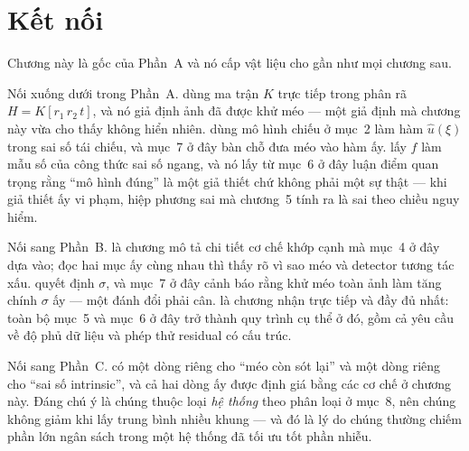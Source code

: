 \documentclass[../../marker.tex]{subfiles}
\begin{document}
\section{Kết nối}

Chương này là gốc của Phần~A và nó cấp vật liệu cho gần như mọi chương sau.

Nối xuống dưới trong Phần~A.  dùng ma trận \(K\) trực tiếp trong phân rã \(H = K[r_1\,r_2\,t]\), và nó giả định ảnh đã được khử méo --- một giả định mà chương này vừa cho thấy không hiển nhiên.  dùng mô hình chiếu ở mục~2 làm hàm \(\hat{u}(\xi)\) trong sai số tái chiếu, và mục~7 ở đây bàn chỗ đưa méo vào hàm ấy.  lấy \(f\) làm mẫu số của công thức sai số ngang, và nó lấy từ mục~6 ở đây luận điểm quan trọng rằng ``mô hình đúng'' là một giả thiết chứ không phải một sự thật --- khi giả thiết ấy vi phạm, hiệp phương sai mà chương~5 tính ra là sai theo chiều nguy hiểm.

Nối sang Phần~B.  là chương mô tả chi tiết cơ chế khớp cạnh mà mục~4 ở đây dựa vào; đọc hai mục ấy cùng nhau thì thấy rõ vì sao méo và detector tương tác xấu.  quyết định \(\sigma\), và mục~7 ở đây cảnh báo rằng khử méo toàn ảnh làm tăng chính \(\sigma\) ấy --- một đánh đổi phải cân.  là chương nhận trực tiếp và đầy đủ nhất: toàn bộ mục~5 và mục~6 ở đây trở thành quy trình cụ thể ở đó, gồm cả yêu cầu về độ phủ dữ liệu và phép thử residual có cấu trúc.

Nối sang Phần~C.  có một dòng riêng cho ``méo còn sót lại'' và một dòng riêng cho ``sai số intrinsic'', và cả hai dòng ấy được định giá bằng các cơ chế ở chương này. Đáng chú ý là chúng thuộc loại \emph{hệ thống} theo phân loại ở  mục~8, nên chúng không giảm khi lấy trung bình nhiều khung --- và đó là lý do chúng thường chiếm phần lớn ngân sách trong một hệ thống đã tối ưu tốt phần nhiễu.
\end{document}

